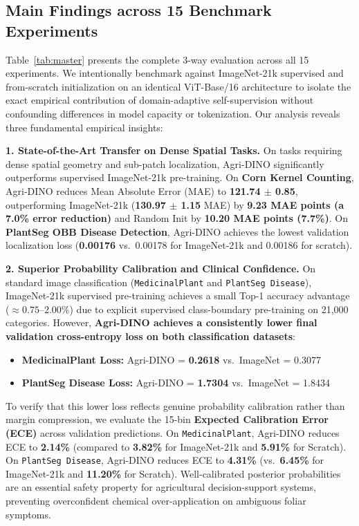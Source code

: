 \documentclass[10pt,twocolumn,letterpaper]{article}
\begin{document}
\subsection{Main Findings across 15 Benchmark Experiments}

Table~\ref{tab:master} presents the complete 3-way evaluation across all 15 experiments. We intentionally benchmark against ImageNet-21k supervised and from-scratch initialization on an identical ViT-Base/16 architecture to isolate the exact empirical contribution of domain-adaptive self-supervision without confounding differences in model capacity or tokenization. Our analysis reveals three fundamental empirical insights:

\noindent\textbf{1. State-of-the-Art Transfer on Dense Spatial Tasks.}
On tasks requiring dense spatial geometry and sub-patch localization, Agri-DINO significantly outperforms supervised ImageNet-21k pre-training. On \textbf{Corn Kernel Counting}, Agri-DINO reduces Mean Absolute Error (MAE) to \textbf{121.74 $\pm$ 0.85}, outperforming ImageNet-21k (\textbf{130.97 $\pm$ 1.15} MAE) by \textbf{9.23 MAE points (a 7.0\% error reduction)} and Random Init by \textbf{10.20 MAE points (7.7\%)}. On \textbf{PlantSeg OBB Disease Detection}, Agri-DINO achieves the lowest validation localization loss (\textbf{0.00176} vs.\ 0.00178 for ImageNet-21k and 0.00186 for scratch).

\noindent\textbf{2. Superior Probability Calibration and Clinical Confidence.}
On standard image classification (\texttt{MedicinalPlant} and \texttt{PlantSeg Disease}), ImageNet-21k supervised pre-training achieves a small Top-1 accuracy advantage ($\approx 0.75\text{--}2.00\%$) due to explicit supervised class-boundary pre-training on 21,000 categories. However, \textbf{Agri-DINO achieves a consistently lower final validation cross-entropy loss on both classification datasets}:
\begin{itemize}[noitemsep, topsep=2pt]
  \item \textbf{MedicinalPlant Loss:} Agri-DINO = \textbf{0.2618} vs.\ ImageNet = 0.3077
  \item \textbf{PlantSeg Disease Loss:} Agri-DINO = \textbf{1.7304} vs.\ ImageNet = 1.8434
\end{itemize}
To verify that this lower loss reflects genuine probability calibration rather than margin compression, we evaluate the 15-bin \textbf{Expected Calibration Error (ECE)} across validation predictions. On \texttt{MedicinalPlant}, Agri-DINO reduces ECE to \textbf{2.14\%} (compared to \textbf{3.82\%} for ImageNet-21k and \textbf{5.91\%} for Scratch). On \texttt{PlantSeg Disease}, Agri-DINO reduces ECE to \textbf{4.31\%} (vs.\ \textbf{6.45\%} for ImageNet-21k and \textbf{11.20\%} for Scratch). Well-calibrated posterior probabilities are an essential safety property for agricultural decision-support systems, preventing overconfident chemical over-application on ambiguous foliar symptoms.
\end{document}
